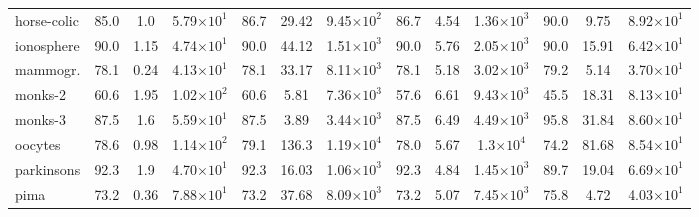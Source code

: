 \begin{table}[t]
\begin{small}
\begin{tabular}{lcccccccccccc}
			horse-colic    & 85.0                                 & 1.0                                  & 5.79{\tiny \(\times 10^{1}\)}     & 86.7                            & 29.42  & 9.45{\tiny \(\times 10^{2}\)} & 86.7 & 4.54 & 1.36{\tiny \(\times 10^{3}\)}  & 90.0 & 9.75  & 8.92{\tiny \(\times 10^{1}\)} \\
			ionosphere     & 90.0                                 & 1.15                                 & 4.74{\tiny \(\times 10^{1}\)}     & 90.0                            & 44.12  & 1.51{\tiny \(\times 10^{3}\)} & 90.0 & 5.76 & 2.05{\tiny \(\times 10^{3}\)}  & 90.0 & 15.91 & 6.42{\tiny \(\times 10^{1}\)} \\
			mammogr.     & 78.1                                 & 0.24                                 & 4.13{\tiny \(\times 10^{1}\)}     & 78.1                            & 33.17  & 8.11{\tiny \(\times 10^{3}\)} & 78.1 & 5.18 & 3.02{\tiny \(\times 10^{3}\)}  & 79.2 & 5.14  & 3.70{\tiny \(\times 10^{1}\)} \\
			monks-2        & 60.6                                 & 1.95                                 & 1.02{\tiny \(\times 10^{2}\)}     & 60.6                            & 5.81   & 7.36{\tiny \(\times 10^{3}\)} & 57.6 & 6.61 & 9.43{\tiny \(\times 10^{3}\)}  & 45.5 & 18.31 & 8.13{\tiny \(\times 10^{1}\)} \\
			monks-3        & 87.5                                 & 1.6                                  & 5.59{\tiny \(\times 10^{1}\)}     & 87.5                            & 3.89   & 3.44{\tiny \(\times 10^{3}\)} & 87.5 & 6.49 & 4.49{\tiny \(\times 10^{3}\)}  & 95.8 & 31.84 & 8.60{\tiny \(\times 10^{1}\)} \\
			oocytes        & 78.6                                 & 0.98                                 & 1.14{\tiny \(\times 10^{2}\)}     & 79.1                            & 136.3  & 1.19{\tiny \(\times 10^{4}\)} & 78.0 & 5.67 & 1.3{\tiny \(\times 10^{4}\)}   & 74.2 & 81.68 & 8.54{\tiny \(\times 10^{1}\)} \\
			parkinsons     & 92.3                                 & 1.9                                  & 4.70{\tiny \(\times 10^{1}\)}     & 92.3                            & 16.03  & 1.06{\tiny \(\times 10^{3}\)} & 92.3 & 4.84 & 1.45{\tiny \(\times 10^{3}\)}  & 89.7 & 19.04 & 6.69{\tiny \(\times 10^{1}\)} \\
			pima           & 73.2                                 & 0.36                                 & 7.88{\tiny \(\times 10^{1}\)}     & 73.2                            & 37.68  & 8.09{\tiny \(\times 10^{3}\)} & 73.2 & 5.07 & 7.45{\tiny \(\times 10^{3}\)}  & 75.8 & 4.72  & 4.03{\tiny \(\times 10^{1}\)} \\

\end{tabular}
\end{small}
\end{table}
